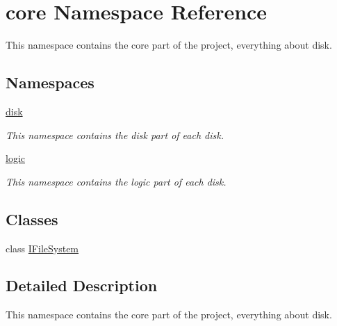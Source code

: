 \hypertarget{namespacecore}{}\section{core Namespace Reference}
\label{namespacecore}


This namespace contains the core part of the project, everything about disk.  


\subsection*{Namespaces}
\begin{DoxyCompactItemize}
\item 
 \mbox{\hyperlink{namespacecore_1_1disk}{disk}}
\begin{DoxyCompactList}\small\item\em This namespace contains the disk part of each disk. \end{DoxyCompactList}\item 
 \mbox{\hyperlink{namespacecore_1_1logic}{logic}}
\begin{DoxyCompactList}\small\item\em This namespace contains the logic part of each disk. \end{DoxyCompactList}\end{DoxyCompactItemize}
\subsection*{Classes}
\begin{DoxyCompactItemize}
\item 
class \mbox{\hyperlink{classcore_1_1_i_file_system}{I\+File\+System}}
\end{DoxyCompactItemize}


\subsection{Detailed Description}
This namespace contains the core part of the project, everything about disk. 